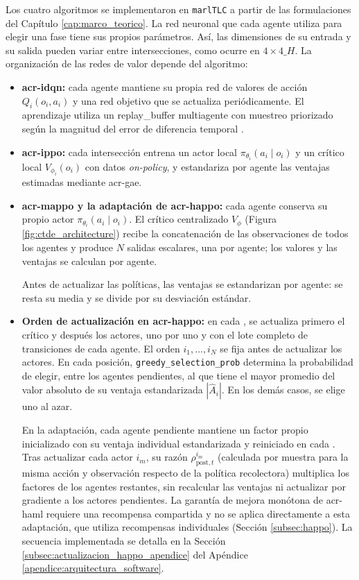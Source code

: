 Los cuatro algoritmos se implementaron en \texttt{marlTLC} a partir de las formulaciones del Capítulo \ref{cap:marco_teorico}. La red neuronal que cada agente utiliza para elegir una fase tiene sus propios parámetros. Así, las dimensiones de su entrada y su salida pueden variar entre intersecciones, como ocurre en $4\times4\_H$. La organización de las redes de valor depende del algoritmo:
\begin{itemize}
    \item \textbf{\acrshort{acr-idqn}:} cada agente mantiene su propia red de valores de acción $Q_i(o_i,a_i)$ y una red objetivo que se actualiza periódicamente. El aprendizaje utiliza un \gls{replay_buffer} multiagente con muestreo priorizado según la magnitud del error de diferencia temporal \cite{schaul2016prioritized}.
    \item \textbf{\acrshort{acr-ippo}:} cada intersección entrena un actor local $\pi_{\theta_i}(a_i\mid o_i)$ y un crítico local $V_{\phi_i}(o_i)$ con datos \textit{on-policy}, y estandariza por agente las ventajas estimadas mediante \acrshort{acr-gae}.
    \item \textbf{\acrshort{acr-mappo} y la adaptación de \acrshort{acr-happo}:} cada agente conserva su propio actor $\pi_{\theta_i}(a_i\mid o_i)$. El crítico centralizado $V_\phi$ (Figura \ref{fig:ctde_architecture}) recibe la concatenación de las observaciones de todos los agentes y produce $N$ salidas escalares, una por agente; los valores y las ventajas se calculan por agente.

    Antes de actualizar las políticas, las ventajas se estandarizan por agente: se resta su media y se divide por su desviación estándar.
    \item \textbf{Orden de actualización en \acrshort{acr-happo}:} en cada , se actualiza primero el crítico y después los actores, uno por uno y con el lote completo de transiciones de cada agente. El orden $i_1,\ldots,i_N$ se fija antes de actualizar los actores. En cada posición, \texttt{greedy\_selection\_prob} determina la probabilidad de elegir, entre los agentes pendientes, al que tiene el mayor promedio del valor absoluto de su ventaja estandarizada $|\hat{A}_i|$. En los demás casos, se elige uno al azar.

    En la adaptación, cada agente pendiente mantiene un factor propio inicializado con su ventaja individual estandarizada y reiniciado en cada . Tras actualizar cada actor $i_m$, su razón $\rho_{\text{post},t}^{i_m}$ (calculada por muestra para la misma acción y observación respecto de la política recolectora) multiplica los factores de los agentes restantes, sin recalcular las ventajas ni actualizar por gradiente a los actores pendientes. La garantía de mejora monótona de \acrshort{acr-haml} requiere una recompensa compartida y no se aplica directamente a esta adaptación, que utiliza recompensas individuales (Sección \ref{subsec:happo}). La secuencia implementada se detalla en la Sección \ref{subsec:actualizacion_happo_apendice} del Apéndice \ref{apendice:arquitectura_software}.
\end{itemize}

